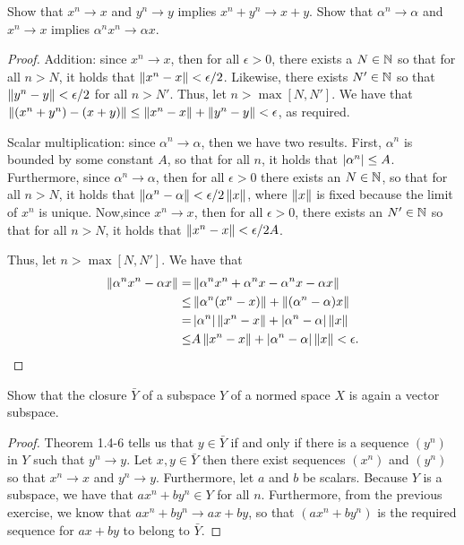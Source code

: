 \begin{exercise}{5}
Show that $x^n\to x$ and $y^n\to y$ implies $x^n+y^n\to x+y$. Show that $\alpha^n\to\alpha$ and $x^n\to x$ implies $\alpha^nx^n\to \alpha x$.
\end{exercise}
\begin{proof}
Addition: since $x^n\to x$, then for all $\epsilon>0$, there exists a $N\in\mathbb{N}$ so that for all $n>N$, it holds that $\left\lVert x^n-x\right\rVert<\epsilon/2$. Likewise, there exists $N'\in\mathbb{N}$ so that $\left\lVert y^n-y\right\rVert<\epsilon/2$ for all $n>N'$. Thus, let $n>\max[N,N']$. We have that $\left\lVert (x^n+y^n)-(x+y)\right\rVert\leq \left\lVert x^n-x\right\rVert+\left\lVert y^n-y\right\rVert<\epsilon$, as required.

Scalar multiplication: since $\alpha^n\to\alpha$, then we have two results. First, $\alpha^n$ is bounded by some constant $A$, so that for all $n$, it holds that $\left\lvert \alpha^n\right\rvert\leq A$. Furthermore, since $\alpha^n\to\alpha$, then for all $\epsilon>0$ there exists an $N\in\mathbb{N}$, so that for all $n>N$, it holds that $\left\lVert \alpha^n-\alpha\right\rVert<\epsilon/2\left\lVert x\right\rVert$, where $\left\lVert x\right\rVert$ is fixed because the limit of $x^n$ is unique. Now,since $x^n\to x$, then for all $\epsilon>0$, there exists an $N'\in\mathbb{N}$ so that for all $n>N$, it holds that $\left\lVert x^n-x\right\rVert<\epsilon/2A$.

Thus, let $n>\max[N,N']$. We have that 
\begin{align*}
    \left\lVert \alpha^nx^n-\alpha x\right\rVert 
    =& \left\lVert \alpha^nx^n+\alpha^n x-\alpha^n x -\alpha x\right\rVert\\
    \leq&\left\lVert \alpha^n(x^n-x)\right\rVert+\left\lVert (\alpha^n-\alpha)x\right\rVert\\
    =& \left\lvert \alpha^n\right\rvert\left\lVert x^n-x\right\rVert+\left\lvert \alpha^n-\alpha\right\rvert\left\lVert x\right\rVert\\
    \leq& A\left\lVert x^n-x\right\rVert+\left\lvert \alpha^n-\alpha\right\rvert\left\lVert x\right\rVert<\epsilon.
\end{align*}
\end{proof}

\begin{exercise}{6}
Show that the closure $\bar{Y}$ of a subspace $Y$ of a normed space $X$ is again a vector subspace.
\end{exercise}
\begin{proof}
Theorem 1.4-6 tells us that $y\in\bar{Y}$ if and only if there is a sequence $(y^n)$ in $Y$ such that $y^n\to y$. Let $x,y\in\bar{Y}$ then there exist sequences $(x^n)$ and $(y^n)$ so that $x^n\to x$ and $y^n\to y$. Furthermore, let $a$ and $b$ be scalars. Because $Y$ is a subspace, we have that $ax^n+by^n\in Y$ for all $n$. Furthermore, from the previous exercise, we know that $ax^n+by^n\to ax+by$, so that $(ax^n+by^n)$ is the required sequence for $ax+by$ to belong to $\bar{Y}$.
\end{proof}

